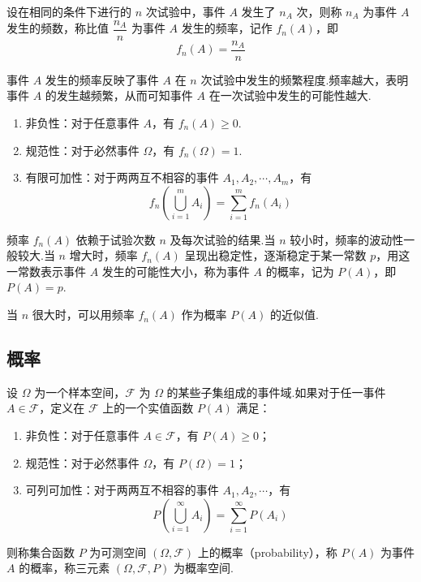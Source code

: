 \begin{definition}
    \indent 设在相同的条件下进行的 $n$ 次试验中，事件 $A$ 发生了 $n_A$ 次，则称 $n_A$ 为事件 $A$ 发生的{\heiti 频数}，称比值 $\dfrac{n_A}{n}$ 为事件 $A$ 发生的{\heiti 频率}，记作 $f_n(A)$，即
    $$
    f_n(A)=\dfrac{n_A}{n}
    $$
\end{definition}

事件 $A$ 发生的频率反映了事件 $A$ 在 $n$ 次试验中发生的频繁程度.频率越大，表明事件 $A$ 的发生越频繁，从而可知事件 $A$ 在一次试验中发生的可能性越大.

\vspace{0.5em}

\begin{property}[][频率的基本性质]
    \begin{enumerate}
        \item {\heiti 非负性}：对于任意事件 $A$，有 $f_n(A) \geqslant 0$.
        \item {\heiti 规范性}：对于必然事件 $\varOmega$，有 $f_n(\varOmega)=1$.
        \item {\heiti 有限可加性}：对于两两互不相容的事件 $A_1,A_2,\cdots,A_m$，有
        $$
        f_n \left(\bigcup_{i=1}^m A_i \right) = \sum_{i=1}^m f_n(A_i)
        $$
    \end{enumerate}
\end{property}

频率 $f_n(A)$ 依赖于试验次数 $n$ 及每次试验的结果.当 $n$ 较小时，频率的波动性一般较大.当 $n$ 增大时，频率 $f_n(A)$ 呈现出稳定性，逐渐稳定于某一常数 $p$，用这一常数表示事件 $A$ 发生的可能性大小，称为事件 $A$ 的概率，记为 $P(A)$，即 $P(A)=p$.

当 $n$ 很大时，可以用频率 $f_n(A)$ 作为概率 $P(A)$ 的近似值.

\subsection{概率}

\begin{definition}
    \indent 设 $\varOmega$ 为一个样本空间，$\mathcal{F}$ 为 $\varOmega$ 的某些子集组成的事件域.如果对于任一事件 $A \in \mathcal{F}$，定义在 $\mathcal{F}$ 上的一个实值函数 $P(A)$ 满足：
    \begin{enumerate}
        \item 非负性：对于任意事件 $A \in \mathcal{F}$，有 $P(A) \geqslant 0$；
        \item 规范性：对于必然事件 $\varOmega$，有 $P(\varOmega)=1$；
        \item 可列可加性：对于两两互不相容的事件 $A_1,A_2,\cdots$，有
        $$
        P \left(\bigcup_{i=1}^\infty A_i \right) = \sum_{i=1}^\infty P(A_i)
        $$
    \end{enumerate}
    则称集合函数 $P$ 为可测空间 $(\varOmega, \mathcal{F})$ 上的{\heiti 概率}（probability），称 $P(A)$ 为事件 $A$ 的{\heiti 概率}，称三元素 $(\varOmega, \mathcal{F}, P)$ 为{\heiti 概率空间}.
\end{definition}

